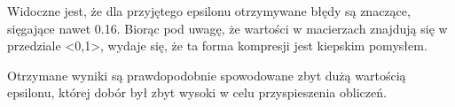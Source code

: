 \documentclass{article}
\begin{document}
Widoczne jest, że dla przyjętego epsilonu otrzymywane błędy są znaczące, sięgające
 nawet 0.16. Biorąc pod uwagę, że wartości w macierzach znajdują się w przedziale <0,1>,
  wydaje się, że ta forma kompresji jest kiepskim pomysłem.

Otrzymane wyniki są prawdopodobnie spowodowane zbyt dużą wartością epsilonu, której
 dobór był zbyt wysoki w celu przyspieszenia obliczeń.
\FloatBarrier
\end{document}
